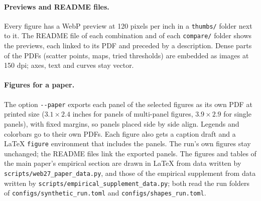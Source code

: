 \documentclass[11pt]{article}
\newcommand{\code}[1]{\texttt{#1}}
\begin{document}
\paragraph{Previews and README files.} Every figure has a WebP preview at 120 pixels per inch in a \code{thumbs/} folder next to it. The README file of each combination and of each \code{compare/} folder shows the previews, each linked to its PDF and preceded by a description. Dense parts of the PDFs (scatter points, maps, tried thresholds) are embedded as images at 150 dpi; axes, text and curves stay vector.

\paragraph{Figures for a paper.} The option \code{-{}-paper} exports each panel of the selected figures as its own PDF at printed size ($3.1\times2.4$ inches for panels of multi-panel figures, $3.9\times2.9$ for single panels), with fixed margins, so panels placed side by side align. Legends and colorbars go to their own PDFs. Each figure also gets a caption draft and a \LaTeX{} \code{figure} environment that includes the panels. The run's own figures stay unchanged; the README files link the exported panels. The figures and tables of the main paper's empirical section are drawn in \LaTeX{} from data written by \code{scripts/web27\_paper\_data.py}, and those of the empirical supplement from data written by \code{scripts/empirical\_supplement\_data.py}; both read the run folders of \code{configs/synthetic\_run.toml} and \code{configs/shapes\_run.toml}.
\end{document}
